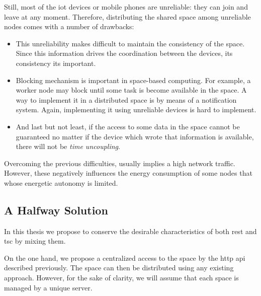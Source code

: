 Still, most of the \ac{iot} devices or mobile phones are unreliable: they can join and leave at any moment.
Therefore, distributing the shared space among unreliable nodes comes with a number of drawbacks:
\begin{itemize}
  \item This unreliability makes difficult to maintain the consistency of the space. %
        Since this information drives the coordination between the devices, its consistency its important.
  \item Blocking mechanism is important in space-based computing.
        For example, a worker node may block until some task is become available in the space.
        A way to implement it in a distributed space is by means of a notification system.
        Again, implementing it using unreliable devices is hard to implement. %
  \item And last but not least, if the access to some data in the space cannot be guaranteed no matter if the device which wrote that information is available, there will not be \emph{time uncoupling}.
\end{itemize}
Overcoming the previous difficulties, usually implies a high network traffic.
However, these negatively influences the energy consumption of some nodes that whose energetic autonomy is limited.


\subsection{A Halfway Solution}

In this thesis we propose to conserve the desirable characteristics of both \ac{rest} and \ac{tsc} by mixing them.

On the one hand, we propose a centralized access to the space by the \acs{http} \ac{api} described previously.
The space can then be distributed using any existing approach. %
However, for the sake of clarity, we will assume that each space is managed by a unique server.

